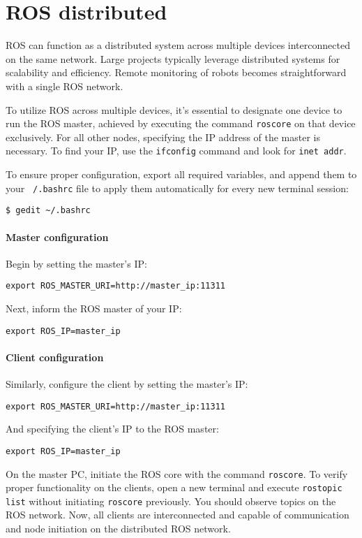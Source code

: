 \section{ROS distributed}

ROS can function as a distributed system across multiple devices interconnected on the same network. 
Large projects typically leverage distributed systems for scalability and efficiency. 
Remote monitoring of robots becomes straightforward with a single ROS network.

To utilize ROS across multiple devices, it's essential to designate one device to run the ROS master, achieved by executing the command \texttt{roscore} on that device exclusively. 
For all other nodes, specifying the IP address of the master is necessary. 
To find your IP, use the \texttt{ifconfig} command and look for \texttt{inet addr}.

To ensure proper configuration, export all required variables, and append them to your \texttt{~/.bashrc} file to apply them automatically for every new terminal session:
\begin{verbatim}
$ gedit ~/.bashrc
\end{verbatim}
\paragraph*{Master configuration}
Begin by setting the master's IP:
\begin{verbatim}
export ROS_MASTER_URI=http://master_ip:11311
\end{verbatim}
Next, inform the ROS master of your IP:
\begin{verbatim}
export ROS_IP=master_ip
\end{verbatim}
\paragraph*{Client configuration}
Similarly, configure the client by setting the master's IP:
\begin{verbatim}
export ROS_MASTER_URI=http://master_ip:11311
\end{verbatim}
And specifying the client's IP to the ROS master:
\begin{verbatim}
export ROS_IP=master_ip
\end{verbatim}

On the master PC, initiate the ROS core with the command \texttt{roscore}. 
To verify proper functionality on the clients, open a new terminal and execute \texttt{rostopic list} without initiating \texttt{roscore} previously. 
You should observe topics on the ROS network. 
Now, all clients are interconnected and capable of communication and node initiation on the distributed ROS network.

